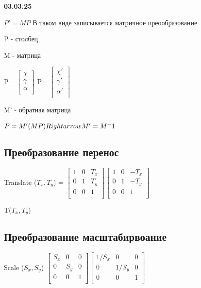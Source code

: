 \documentclass{article}
\begin{document}
\textbf{03.03.25}


$P'= MP$ В таком виде записывается матричное преообразование

P - столбец

M - матрица

P=
$\begin{bmatrix}
    \chi \\
    \gamma  \\ 
    \alpha  \\

\end{bmatrix}$
P=
$\begin{bmatrix}
    \chi' \\
    \gamma ' \\ 
    \alpha ' \\

\end{bmatrix}$


M' - обратная матрица


$P=M'(MP) \\Rightarrow  M'=M^-1$


\subsection{Преобразование перенос}


Translate ($T_x, T_y$) = 
$\begin{bmatrix}
    1 & 0  & T_x \\[0.3em]
    0 & 1  & T_y \\[0.3em]
    0 & 0  & 1 \\[0.3em]
\end{bmatrix}
\begin{bmatrix}
    1 & 0  & -T_x \\[0.3em]
    0 & 1  & -T_y \\[0.3em]
    0 & 0  & 1 \\[0.3em]
\end{bmatrix}$


T($T_x,T_y$)


\subsection{Преобразование масштабирвоание}

Scale ($S_x,S_y$) 
$\begin{bmatrix}
    S_x & 0  & 0 \\[0.3em]
    0 & S_y  & 0 \\[0.3em]
    0 & 0  & 1 \\[0.3em]
\end{bmatrix}
\begin{bmatrix}
    1/S_x & 0  & 0 \\[0.3em]
    0 & 1/S_y  & 0 \\[0.3em]
    0 & 0  & 1 \\[0.3em]
\end{bmatrix}$
\end{document}
